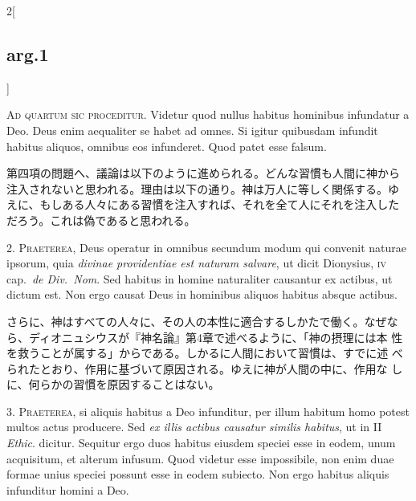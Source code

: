 \documentclass[paper=a4paper,fontsize=10pt,jafontsize=9pt,titlepage]{jlreq}
\begin{document}
\begin{paracol}{2}[\subsection{arg.1}]

{\scshape Ad quartum sic proceditur}. Videtur quod nullus habitus
hominibus infundatur a Deo. Deus enim aequaliter se habet ad omnes. Si
igitur quibusdam infundit habitus aliquos, omnibus eos
infunderet. Quod patet esse falsum.

\switchcolumn

第四項の問題へ、議論は以下のように進められる。どんな習慣も人間に神から
注入されないと思われる。理由は以下の通り。神は万人に等しく関係する。ゆ
えに、もしある人々にある習慣を注入すれば、それを全て人にそれを注入した
だろう。これは偽であると思われる。


2. {\scshape Praeterea}, Deus operatur in omnibus secundum modum qui
convenit naturae ipsorum, quia {\itshape divinae providentiae est
naturam salvare}, ut dicit Dionysius, {\scshape iv} cap.~{\itshape de
Div.~Nom}. Sed habitus in homine naturaliter causantur ex actibus, ut
dictum est. Non ergo causat Deus in hominibus aliquos habitus absque
actibus.

\switchcolumn

さらに、神はすべての人々に、その人の本性に適合するしかたで働く。なぜな
ら、ディオニュシウスが『神名論』第4章で述べるように、「神の摂理には本
性を救うことが属する」からである。しかるに人間において習慣は、すでに述
べられたとおり、作用に基づいて原因される。ゆえに神が人間の中に、作用な
しに、何らかの習慣を原因することはない。


3. {\scshape Praeterea}, si aliquis habitus a Deo infunditur, per
illum habitum homo potest multos actus producere. Sed {\itshape ex
illis actibus causatur similis habitus}, ut in II {\itshape
Ethic}. dicitur. Sequitur ergo duos habitus eiusdem speciei esse in
eodem, unum acquisitum, et alterum infusum. Quod videtur esse
impossibile, non enim duae formae unius speciei possunt esse in eodem
subiecto. Non ergo habitus aliquis infunditur homini a Deo.


\end{paracol}
\end{document}
